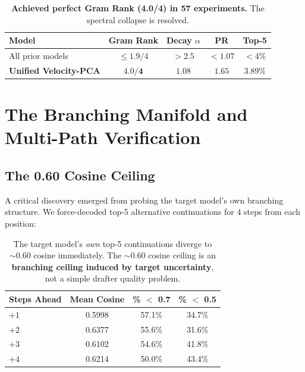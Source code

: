 \documentclass[11pt,a4paper]{article}
\begin{document}
\begin{table}[H]
\centering
\small
\begin{tabular}{@{}lcccc@{}}
\toprule
\textbf{Model} & \textbf{Gram Rank} & \textbf{Decay $\alpha$} & \textbf{PR} & \textbf{Top-5} \\
\midrule
All prior models & $\leq 1.9/4$ & $>2.5$ & $<1.07$ & $<4\%$ \\
\textbf{Unified Velocity-PCA} & $\mathbf{4.0/4}$ & $\mathbf{1.08}$ & $\mathbf{1.65}$ & 3.89\% \\
\bottomrule
\end{tabular}
\caption{\textbf{Achieved perfect Gram Rank (4.0/4) in 57 experiments.}
The spectral collapse is resolved.}
\label{tab:unified_spectral}
\end{table}


\section{The Branching Manifold and Multi-Path Verification}
\label{sec:branching}

\subsection{The 0.60 Cosine Ceiling}

A critical discovery emerged from probing the target model's own branching structure.
We force-decoded top-5 alternative continuations for 4 steps from each position:

\begin{table}[H]
\centering
\small
\begin{tabular}{@{}lccc@{}}
\toprule
\textbf{Steps Ahead} & \textbf{Mean Cosine} & \textbf{\% $<$ 0.7} & \textbf{\% $<$ 0.5} \\
\midrule
$+1$ & 0.5998 & 57.1\% & 34.7\% \\
$+2$ & 0.6377 & 55.6\% & 31.6\% \\
$+3$ & 0.6102 & 54.6\% & 41.8\% \\
$+4$ & 0.6214 & 50.0\% & 43.4\% \\
\bottomrule
\end{tabular}
\caption{The target model's \emph{own} top-5 continuations diverge to ${\sim}0.60$ cosine immediately.
The ${\sim}0.60$ cosine ceiling is an \textbf{branching ceiling induced by target uncertainty}, not a simple drafter quality problem.}
\label{tab:branching}
\end{table}
\end{document}
